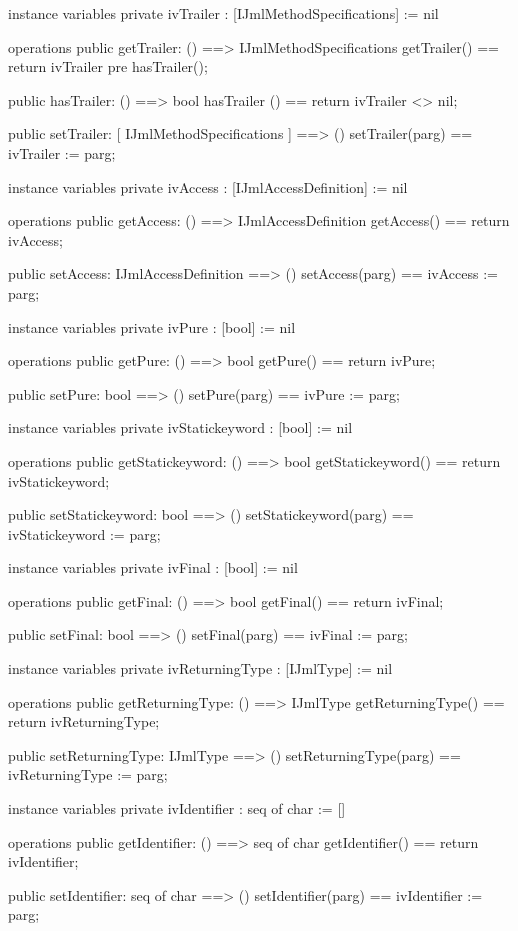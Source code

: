 \begin{vdm_al}
instance variables
  private ivTrailer : [IJmlMethodSpecifications] := nil

operations
  public getTrailer: () ==> IJmlMethodSpecifications
  getTrailer() == return ivTrailer
    pre hasTrailer();

  public hasTrailer: () ==> bool
  hasTrailer () == return ivTrailer <> nil;

  public setTrailer: [ IJmlMethodSpecifications ] ==> ()
  setTrailer(parg) == ivTrailer := parg;

instance variables
  private ivAccess : [IJmlAccessDefinition] := nil

operations
  public getAccess: () ==> IJmlAccessDefinition
  getAccess() == return ivAccess;

  public setAccess: IJmlAccessDefinition ==> ()
  setAccess(parg) == ivAccess := parg;

instance variables
  private ivPure : [bool] := nil

operations
  public getPure: () ==> bool
  getPure() == return ivPure;

  public setPure: bool ==> ()
  setPure(parg) == ivPure := parg;

instance variables
  private ivStatickeyword : [bool] := nil

operations
  public getStatickeyword: () ==> bool
  getStatickeyword() == return ivStatickeyword;

  public setStatickeyword: bool ==> ()
  setStatickeyword(parg) == ivStatickeyword := parg;

instance variables
  private ivFinal : [bool] := nil

operations
  public getFinal: () ==> bool
  getFinal() == return ivFinal;

  public setFinal: bool ==> ()
  setFinal(parg) == ivFinal := parg;

instance variables
  private ivReturningType : [IJmlType] := nil

operations
  public getReturningType: () ==> IJmlType
  getReturningType() == return ivReturningType;

  public setReturningType: IJmlType ==> ()
  setReturningType(parg) == ivReturningType := parg;

instance variables
  private ivIdentifier : seq of char := []

operations
  public getIdentifier: () ==> seq of char
  getIdentifier() == return ivIdentifier;

  public setIdentifier: seq of char ==> ()
  setIdentifier(parg) == ivIdentifier := parg;


\end{vdm_al}

